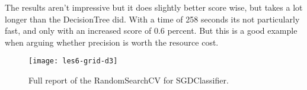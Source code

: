 \documentclass{article}
\begin{document}
\noindent
The results aren't impressive but it does slightly better score wise, but takes a lot longer than the DecisionTree did.
With a time of 258 seconds its not particularly fast, and only with an increased score of 0.6 percent.
But this is a good example when arguing whether precision is worth the resource cost.

\begin{figure}[H]
  \centering
    \texttt{[image: les6-grid-d3]}
    \caption{Full report of the RandomSearchCV for SGDClassifier.}
    \label{fig:les6-grid-d3}
\end{figure}
\end{document}
